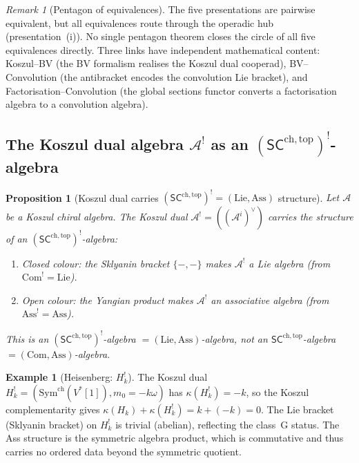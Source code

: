 \documentclass[11pt,reqno]{amsart}
\newtheorem{proposition}[theorem]{Proposition}
\theoremstyle{definition}
\newtheorem{example}[theorem]{Example}
\theoremstyle{remark}
\newtheorem{remark}[theorem]{Remark}
\providecommand{\cA}{\mathcal{A}}
\providecommand{\SCchtop}{\ensuremath{\mathsf{SC}^{\mathrm{ch,top}}}}
\providecommand{\Sym}{\mathrm{Sym}}
\begin{document}
\begin{remark}[Pentagon of equivalences]
\label{rem:e-pentagon}
The five presentations are pairwise equivalent, but all
equivalences route through the operadic hub (presentation~(i)).
No single pentagon theorem closes the circle of all five
equivalences directly. Three links have independent mathematical
content: Koszul--BV (the BV formalism realises the Koszul dual
cooperad), BV--Convolution (the antibracket encodes the
convolution Lie bracket), and Factorisation--Convolution
(the global sections functor converts a factorisation algebra
to a convolution algebra).
\end{remark}

\subsection{The Koszul dual algebra $\cA^!$ as an
$(\SCchtop)^!$-algebra}

\begin{proposition}[Koszul dual carries $(\SCchtop)^! =
(\mathrm{Lie}, \mathrm{Ass})$ structure]
\label{prop:e-koszul-dual-sc}
Let $\cA$ be a Koszul chiral algebra. The Koszul dual
$\cA^! = ((\cA^i)^\vee)$ carries the structure of an
$(\SCchtop)^!$-algebra:
\begin{enumerate}[label=\textup{(\roman*)}]
\item \emph{Closed colour:}
 the Sklyanin bracket $\{-,-\}$ makes
 $\cA^!$ a Lie algebra (from $\mathrm{Com}^! = \mathrm{Lie}$).
\item \emph{Open colour:}
 the Yangian product makes $\cA^!$ an associative algebra
 (from $\mathrm{Ass}^! = \mathrm{Ass}$).
\end{enumerate}
This is an $(\SCchtop)^!$-algebra $= (\mathrm{Lie},
\mathrm{Ass})$-algebra, \emph{not} an $\SCchtop$-algebra
$= (\mathrm{Com}, \mathrm{Ass})$-algebra.
\end{proposition}

\begin{example}[Heisenberg: $H_k^!$]
\label{ex:e-heis-koszul-dual}
The Koszul dual
$H_k^!=(\Sym^{\mathrm{ch}}(V^*[1]),m_0=-k\omega)$ has
$\kappa(H_k^!) = -k$, so the Koszul complementarity gives
$\kappa(H_k) + \kappa(H_k^!) = k + (-k) = 0$. The Lie bracket
(Sklyanin bracket) on $H_k^!$ is trivial (abelian), reflecting
the class~G status. The Ass structure is the symmetric algebra
product, which is commutative and thus carries no ordered data
beyond the symmetric quotient.
\end{example}
\end{document}
